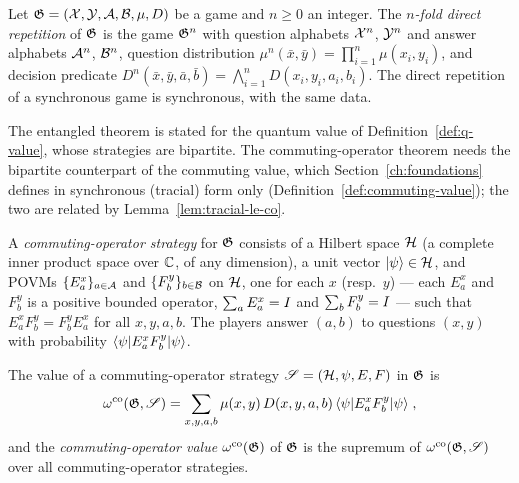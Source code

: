 \begin{definition}
\label{def:direct-repetition}
\leanok
Let $\mathfrak{G} = (\mathcal{X}, \mathcal{Y}, \mathcal{A}, \mathcal{B}, \mu, D)$ be a game and $n \geq 0$ an integer. The
\emph{$n$-fold direct repetition} of $\mathfrak{G}$ is the game $\mathfrak{G}^{n}$ with question
alphabets $\mathcal{X}^n$, $\mathcal{Y}^n$ and answer alphabets $\mathcal{A}^n$, $\mathcal{B}^n$, question distribution
$\mu^{n}(\bar{x}, \bar{y}) = \prod_{i=1}^{n} \mu(x_i, y_i)$, and decision predicate
$D^{n}(\bar{x}, \bar{y}, \bar{a}, \bar{b}) = \bigwedge_{i=1}^{n} D(x_i, y_i, a_i, b_i)$.
The direct repetition of a synchronous game is synchronous, with the same data.
\end{definition}

The entangled theorem is stated for the quantum value of Definition~\ref{def:q-value},
whose strategies are bipartite. The commuting-operator theorem needs the bipartite
counterpart of the commuting value, which Section~\ref{ch:foundations} defines in
synchronous (tracial) form only (Definition~\ref{def:commuting-value}); the two are
related by Lemma~\ref{lem:tracial-le-co}.

\begin{definition}
\label{def:co-strategy-bipartite}
\leanok
\qlib{}
A \emph{commuting-operator strategy} for $\mathfrak{G}$ consists of a Hilbert space $\mathcal{H}$ (a
complete inner product space over $\mathbb{C}$, of any dimension), a unit vector $|\psi\rangle
\in \mathcal{H}$, and POVMs $\{E^x_a\}_{a \in \mathcal{A}}$ and $\{F^y_b\}_{b \in \mathcal{B}}$ on $\mathcal{H}$, one
for each $x$ (resp.\ $y$) --- each $E^x_a$ and $F^y_b$ is a positive bounded operator,
$\sum_a E^x_a = I$ and $\sum_b F^y_b = I$ --- such that $E^x_a F^y_b = F^y_b
E^x_a$ for all $x, y, a, b$. The players answer $(a, b)$ to questions $(x, y)$ with
probability $\langle\psi| E^x_a F^y_b |\psi\rangle$.
\end{definition}

\begin{definition}
\label{def:co-value-bipartite}
\leanok
\qlib{}
The value of a commuting-operator strategy $\mathscr{S} = (\mathcal{H}, \psi, E, F)$ in $\mathfrak{G}$
is
\begin{equation*}
  \omega^{\mathrm{co}}(\mathfrak{G}, \mathscr{S}) = \sum_{x, y, a, b} \mu(x,y)\, D(x,y,a,b)\,
  \langle\psi| E^x_a F^y_b |\psi\rangle\;,
\end{equation*}
and the \emph{commuting-operator value} $\omega^{\mathrm{co}}(\mathfrak{G})$ of $\mathfrak{G}$ is the supremum of
$\omega^{\mathrm{co}}(\mathfrak{G}, \mathscr{S})$ over all commuting-operator strategies.
\end{definition}

